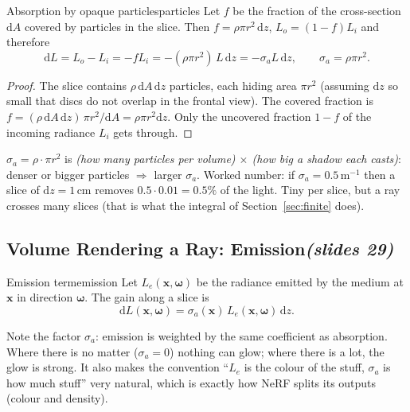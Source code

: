 \documentclass[11pt,a4paper]{article}
\newcommand{\slides}[1]{\texorpdfstring{\hfill{\normalfont\small\emph{(slides #1)}}}{ (slides #1)}}
\newcommand{\x}{\bm{x}}
\newcommand{\w}{\bm{\omega}}
\theoremstyle{remark}\newtheorem*{remark}{Remark}
\begin{document}
\begin{lemma}{Absorption by opaque particles}{particles}
Let $f$ be the fraction of the cross-section $\mathrm dA$ covered by particles in the slice. Then $f=\rho\pi r^2\,\mathrm dz$, $L_o=(1-f)L_i$ and therefore
\[
\mathrm dL=L_o-L_i=-fL_i=-(\rho\pi r^2)\,L\,\mathrm dz=-\sigma_aL\,\mathrm dz,\qquad \sigma_a=\rho\pi r^2 .
\]
\end{lemma}
\begin{proof}
The slice contains $\rho\,\mathrm dA\,\mathrm dz$ particles, each hiding area $\pi r^2$ (assuming $\mathrm dz$ so small that discs do not overlap in the frontal view). The covered fraction is $f=(\rho\,\mathrm dA\,\mathrm dz)\,\pi r^2/\mathrm dA=\rho\pi r^2\mathrm dz$. Only the uncovered fraction $1-f$ of the incoming radiance $L_i$ gets through.
\end{proof}

\begin{intuition}
$\sigma_a=\rho\cdot\pi r^2$ is \emph{(how many particles per volume) $\times$ (how big a shadow each casts)}: denser or bigger particles $\Rightarrow$ larger $\sigma_a$. Worked number: if $\sigma_a=0.5\,\mathrm{m^{-1}}$ then a slice of $\mathrm dz=1\,\mathrm{cm}$ removes $0.5\cdot0.01=0.5\%$ of the light. Tiny per slice, but a ray crosses many slices (that is what the integral of Section~\ref{sec:finite} does).
\end{intuition}

\subsection{Volume Rendering a Ray: Emission\slides{29}}

\begin{definition}{Emission term}{emission}
Let $L_e(\x,\w)$ be the radiance emitted by the medium at $\x$ in direction $\w$. The gain along a slice is
\[
\mathrm dL(\x,\w)=\sigma_a(\x)\,L_e(\x,\w)\,\mathrm dz .
\]
\end{definition}

\begin{intuition}
Note the factor $\sigma_a$: emission is weighted by the same coefficient as absorption. Where there is no matter ($\sigma_a=0$) nothing can glow; where there is a lot, the glow is strong. It also makes the convention ``$L_e$ is the colour of the stuff, $\sigma_a$ is how much stuff'' very natural, which is exactly how NeRF splits its outputs (colour and density).
\end{intuition}
\end{document}
